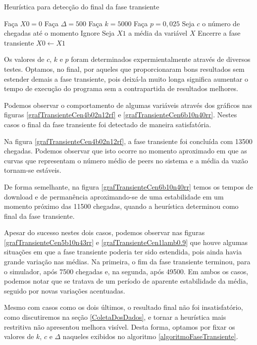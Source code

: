 \documentclass[a4paper,10pt]{article}
\begin{document}
\begin{algorithm}[H]
	\caption{Heurística para detecção do final da fase transiente}
	\label{algoritmoFaseTransiente}
	\begin{algorithmic}
		\STATE Faça $X0 = 0$
		\STATE Faça $\Delta = 500$
		\STATE Faça $k = 5000$
		\STATE Faça $p = 0,025$
		\STATE Seja $c$ o número de chegadas até o momento
				\STATE Ignore
				\STATE Seja $X1$ a média da variável $X$
					\STATE Encerre a fase transiente
				\ELSE
					\STATE $X0 \leftarrow X1$
				\ENDIF
			\ENDIF
		\ENDFOR
	\end{algorithmic}
\end{algorithm}

Os valores de $c$, $k$ e $p$ foram determinados expermientalmente através de diversos testes. Optamos, no final, por aqueles que proporcionaram bons resultados sem estender demais a fase transiente, pois deixá-la muito longa significa aumentar o tempo de execução do programa sem a contrapartida de resultados melhores.

Podemos observar o comportamento de algumas variáveis através dos gráficos nas figuras \ref{grafTransienteCen4b02n12rf} e \ref{grafTransienteCen6b10n40rr}. Nestes casos o final da fase transiente foi detectado de maneira satisfatória.

Na figura \ref{grafTransienteCen4b02n12rf}, a fase transiente foi concluída com 13500 chegadas. Podemos observar que isto ocorre no momento aproximado em que as curvas que representam o número médio de peers no sistema e a média da vazão tornam-se estáveis.

De forma semelhante, na figura \ref{grafTransienteCen6b10n40rr} temos os tempos de download e de permanência aproximando-se de uma estabilidade em um momento próximo das 11500 chegadas, quando a heurística determinou como final da fase transiente.

Apesar do sucesso nestes dois casos, podemos observar nas figuras \ref{grafTransienteCen5b10n43rr} e \ref{grafTransienteCen1lamb0.9} que houve algumas situações em que a fase transiente poderia ter sido estendida, pois ainda havia grande variação nas médias. Na primeira, o fim da fase transiente terminou, para o simulador, após 7500 chegadas e, na segunda, após 49500. Em ambos os casos, podemos notar que se tratava de um período de aparente estabilidade da média, seguido por novas variações acentuadas.

Mesmo com casos como os dois últimos, o resultado final não foi insatisfatório, como discutiremos na seção \ref{ColetaDosDados}, e tornar a heurística mais restritiva não apresentou melhora visível. Desta forma, optamos por fixar os valores de $k$, $c$ e $\Delta$ naqueles exibidos no algoritmo \ref{algoritmoFaseTransiente}.
\end{document}
